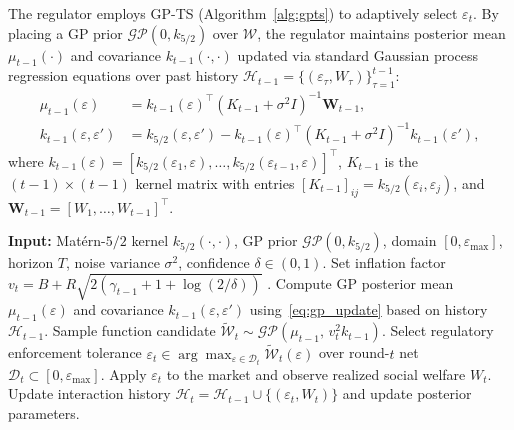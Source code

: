 The regulator employs GP-TS (Algorithm~\ref{alg:gpts}) to adaptively select $\varepsilon_t$. By placing a GP prior $\mathcal{GP}(0, k_{5/2})$ over $\mathcal{W}$, the regulator maintains posterior mean $\mu_{t-1}(\cdot)$ and covariance $k_{t-1}(\cdot,\cdot)$ updated via standard Gaussian process regression equations over past history $\mathcal{H}_{t-1} = \{(\varepsilon_\tau, W_\tau)\}_{\tau=1}^{t-1}$:
\begin{equation}
\label{eq:gp_update}
\begin{aligned}
\mu_{t-1}(\varepsilon) &= k_{t-1}(\varepsilon)^\top (K_{t-1} + \sigma^2 I)^{-1} \mathbf{W}_{t-1}, \\
k_{t-1}(\varepsilon, \varepsilon') &= k_{5/2}(\varepsilon, \varepsilon') - k_{t-1}(\varepsilon)^\top (K_{t-1} + \sigma^2 I)^{-1} k_{t-1}(\varepsilon'),
\end{aligned}
\end{equation}
where $k_{t-1}(\varepsilon) = [k_{5/2}(\varepsilon_1, \varepsilon), \dots, k_{5/2}(\varepsilon_{t-1}, \varepsilon)]^\top$, $K_{t-1}$ is the $(t-1) \times (t-1)$ kernel matrix with entries $[K_{t-1}]_{ij} = k_{5/2}(\varepsilon_i, \varepsilon_j)$, and $\mathbf{W}_{t-1} = [W_1, \dots, W_{t-1}]^\top$.

\begin{algorithm}[t]
\caption{Gaussian Process Thompson Sampling (GP-TS) for IPO Regulation}
\label{alg:gpts}
\begin{algorithmic}[1]
\State \textbf{Input:} Mat\'ern-$5/2$ kernel $k_{5/2}(\cdot,\cdot)$, GP prior $\mathcal{GP}(0, k_{5/2})$, domain $[0, \varepsilon_{\max}]$, horizon $T$, noise variance $\sigma^2$, confidence $\delta \in (0,1)$.
  \State Set inflation factor $v_t = B + R\sqrt{2(\gamma_{t-1} + 1 + \log(2/\delta))}$ \citep{chowdhury2017kernelized}.
  \State Compute GP posterior mean $\mu_{t-1}(\varepsilon)$ and covariance $k_{t-1}(\varepsilon,\varepsilon')$ using~\eqref{eq:gp_update} based on history $\mathcal{H}_{t-1}$.
  \State Sample function candidate $\widetilde{\mathcal{W}}_t \sim \mathcal{GP}(\mu_{t-1},\, v_t^2 k_{t-1})$.
  \State Select regulatory enforcement tolerance $\varepsilon_t \in \arg\max_{\varepsilon \in \mathcal{D}_t} \widetilde{\mathcal{W}}_t(\varepsilon)$ over round-$t$ net $\mathcal{D}_t \subset [0, \varepsilon_{\max}]$.
  \State Apply $\varepsilon_t$ to the market and observe realized social welfare $W_t$.
  \State Update interaction history $\mathcal{H}_t = \mathcal{H}_{t-1} \cup \{(\varepsilon_t, W_t)\}$ and update posterior parameters.
\EndFor
\end{algorithmic}
\end{algorithm}

